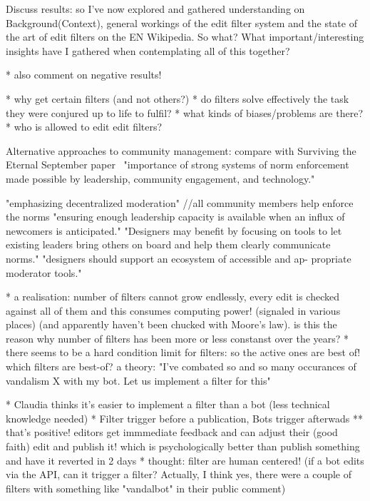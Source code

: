 Discuss results:
so I've now explored and gathered understanding on Background(Context), general workings of the edit filter system and the state of the art of edit filters on the EN Wikipedia.
So what? What important/interesting insights have I gathered when contemplating all of this together?

* also comment on negative results!

* why get certain filters (and not others?)
* do filters solve effectively the task they were conjured up to life to fulfil?
* what kinds of biases/problems are there?
* who is allowed to edit edit filters?

Alternative approaches to community management:
compare with Surviving the Eternal September paper~\cite{KieMonHill2016}
"importance of strong
systems of norm enforcement made possible by leadership,
community engagement, and technology."

"emphasizing decentralized moderation" //all community members help enforce the norms
"ensuring enough leadership capacity is available
when an influx of newcomers is anticipated."
"Designers may
benefit by focusing on tools to let existing leaders bring others
on board and help them clearly communicate norms."
"designers should support an ecosystem of accessible and ap-
propriate moderator tools."


* a realisation: number of filters cannot grow endlessly, every edit is checked against all of them and this consumes computing power! (signaled in various places) (and apparently haven't been chucked with Moore's law). is this the reason why number of filters has been more or less constanst over the years?
* there seems to be a hard condition limit for filters: so the active ones are best of! which filters are best-of? a theory: "I've combated so and so many occurances of vandalism X with my bot. Let us implement a filter for this"

* Claudia thinks it's easier to implement a filter than a bot (less technical knowledge needed)
* Filter trigger before a publication, Bots trigger afterwads
  ** that's positive! editors get immmediate feedback and can adjust their (good faith) edit and publish it! which is psychologically better than publish something and have it reverted in 2 days
* thought: filter are human centered! (if a bot edits via the API, can it trigger a filter? Actually, I think yes, there were a couple of filters with something like "vandalbot" in their public comment)

